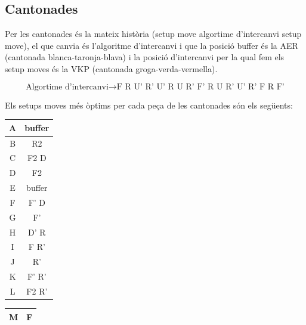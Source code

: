 \subsection{Cantonades}

Per les cantonades és la mateix història (setup move \rightarrow algortime d'intercanvi \rightarrow setup move), el que canvia és l'algoritme d'intercanvi i que la posició buffer és la AER  (cantonada blanca-taronja-blava) i la posició d'intercanvi per la qual fem els setup moves és la VKP (cantonada groga-verda-vermella).

$$ \textrm{Algortime d'intercanvi} \rightarrow \textrm{F R U' R' U' R U R' F' R U R' U' R' F R F'} $$

Els setups moves més òptims per cada peça de les cantonades són els següents:

\begin{table}[h]
    \begin{minipage}{.5\linewidth}
        \centering
        \begin{tabular}{|c|c|}
            \hline
            A & buffer        \\ 
            \hline
            B & R2            \\ 
            \hline
            C & F2 D          \\ 
            \hline
            D & F2            \\ 
            \hline
            E & buffer        \\ 
            \hline
            F & F' D          \\ 
            \hline
            G & F'            \\ 
            \hline
            H & D' R          \\ 
            \hline
            I & F R'          \\ 
            \hline
            J & R'            \\ 
            \hline
            K & F' R'         \\ 
            \hline
            L & F2 R'         \\ 
            \hline
        \end{tabular}
    \end{minipage}
    \begin{minipage}{.5\linewidth}
        \centering
        \begin{tabular}{|c|c|}
            \hline
            M & F             \\ 
            \hline

\end{tabular}
\end{minipage}
\end{table}
